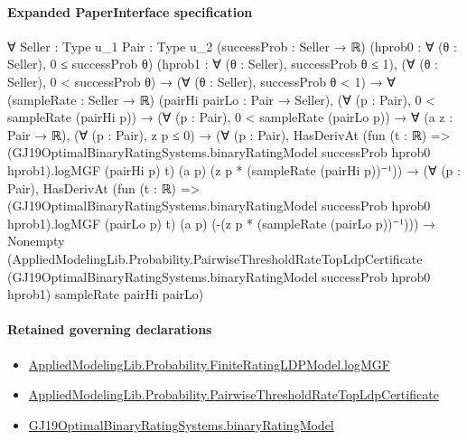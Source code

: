 \documentclass[10pt]{article}
\begin{document}
\paragraph{Expanded PaperInterface specification}
\begin{ReviewVerbatim}
∀ {Seller : Type u_1} {Pair : Type u_2} (successProb : Seller → ℝ) (hprob0 : ∀ (θ : Seller), 0 ≤ successProb θ)
  (hprob1 : ∀ (θ : Seller), successProb θ ≤ 1),
  (∀ (θ : Seller), 0 < successProb θ) →
    (∀ (θ : Seller), successProb θ < 1) →
      ∀ (sampleRate : Seller → ℝ) (pairHi pairLo : Pair → Seller),
        (∀ (p : Pair), 0 < sampleRate (pairHi p)) →
          (∀ (p : Pair), 0 < sampleRate (pairLo p)) →
            ∀ (a z : Pair → ℝ),
              (∀ (p : Pair), z p ≤ 0) →
                (∀ (p : Pair),
                    HasDerivAt
                      (fun (t : ℝ) =>
                        (GJ19OptimalBinaryRatingSystems.binaryRatingModel successProb hprob0 hprob1).logMGF (pairHi p)
                          t)
                      (a p) (z p * (sampleRate (pairHi p))⁻¹)) →
                  (∀ (p : Pair),
                      HasDerivAt
                        (fun (t : ℝ) =>
                          (GJ19OptimalBinaryRatingSystems.binaryRatingModel successProb hprob0 hprob1).logMGF (pairLo p)
                            t)
                        (a p) (-(z p * (sampleRate (pairLo p))⁻¹))) →
                    Nonempty
                      (AppliedModelingLib.Probability.PairwiseThresholdRateTopLdpCertificate
                        (GJ19OptimalBinaryRatingSystems.binaryRatingModel successProb hprob0 hprob1) sampleRate pairHi
                        pairLo)
\end{ReviewVerbatim}

\paragraph{Retained governing declarations}
\begin{itemize}\raggedright
\item \hyperlink{governing-declaration-d36626616b1c1c7d}{Applied\allowbreak{}Modeling\allowbreak{}Lib.\allowbreak{}Probability.\allowbreak{}Finite\allowbreak{}Rating\allowbreak{}LDP\allowbreak{}Model.\allowbreak{}log\allowbreak{}MGF}
\item \hyperlink{governing-declaration-a7435cce7a12ae39}{Applied\allowbreak{}Modeling\allowbreak{}Lib.\allowbreak{}Probability.\allowbreak{}Pairwise\allowbreak{}Threshold\allowbreak{}Rate\allowbreak{}Top\allowbreak{}Ldp\allowbreak{}Certificate}
\item \hyperlink{governing-declaration-de9c5ce9af253833}{GJ19\allowbreak{}Optimal\allowbreak{}Binary\allowbreak{}Rating\allowbreak{}Systems.\allowbreak{}binary\allowbreak{}Rating\allowbreak{}Model}
\end{itemize}
\end{document}
